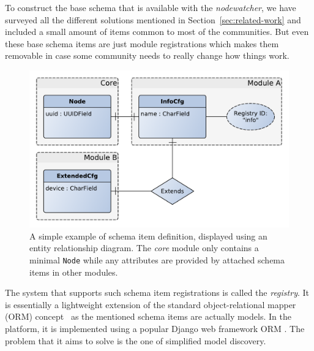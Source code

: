 \documentclass[5p,sort&compress]{elsarticle}
\newcommand{\nodewatcher}{\textit{nodewatcher}}
\begin{document}
To construct the base schema that is available with the \nodewatcher{}, we have surveyed all the different solutions mentioned in Section~\ref{sec:related-work} and included a small amount of items common to most of the communities.
But even these base schema items are just module registrations which makes them removable in case some community needs to really change how things work.

\begin{figure}
  \centering
  \includegraphics[scale=0.47]{figures/registry-example-models.pdf}
  \caption{A simple example of schema item definition, displayed using an entity relationship diagram.
  The \textit{core} module only contains a minimal \texttt{Node} while any attributes are provided by attached schema items in other modules.}
  \label{fig:registry-schema-example}
\end{figure}

The system that supports such schema item registrations is called the \textit{registry}.
It is essentially a lightweight extension of the standard object-relational mapper (ORM) concept~\cite{Bernstein_2007,ONeil_2008} as the mentioned schema items are actually models.
In the platform, it is implemented using a popular Django web framework ORM \cite{django_2005}.
The problem that it aims to solve is the one of simplified model discovery.
\end{document}
